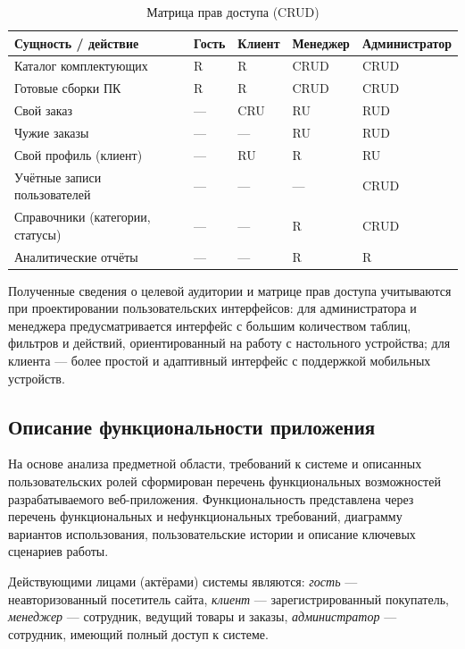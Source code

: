 \begin{table}[ht!]
\caption{Матрица прав доступа (CRUD)}
\label{tab:rbac}
\small
\begin{tabularx}{\textwidth}{|>{\RaggedRight\arraybackslash}p{}|>{\centering\arraybackslash}X|>{\centering\arraybackslash}X|>{\centering\arraybackslash}X|>{\centering\arraybackslash}X|}
\hline
\textbf{Сущность / действие} & \textbf{Гость} & \textbf{Клиент} & \textbf{Мене\-джер} & \textbf{Адми\-нистра\-тор} \\ \hline
Каталог комплектующих & R & R & CRUD & CRUD \\ \hline
Готовые сборки ПК & R & R & CRUD & CRUD \\ \hline
Свой заказ & --- & CRU & RU & RUD \\ \hline
Чужие заказы & --- & --- & RU & RUD \\ \hline
Свой профиль (клиент) & --- & RU & R & RU \\ \hline
Учётные записи пользователей & --- & --- & --- & CRUD \\ \hline
Справочники (категории, статусы) & --- & --- & R & CRUD \\ \hline
Аналитические отчёты & --- & --- & R & R \\ \hline
\end{tabularx}
\end{table}

Полученные сведения о целевой аудитории и матрице прав доступа учитываются при проектировании пользовательских интерфейсов: для администратора и менеджера предусматривается интерфейс с большим количеством таблиц, фильтров и действий, ориентированный на работу с настольного устройства; для клиента --- более простой и адаптивный интерфейс с поддержкой мобильных устройств.

\subsection{Описание функциональности приложения}

На основе анализа предметной области, требований к системе и описанных пользовательских ролей сформирован перечень функциональных возможностей разрабатываемого веб-приложения. Функциональность представлена через перечень функциональных и нефункциональных требований, диаграмму вариантов использования, пользовательские истории и описание ключевых сценариев работы.

Действующими лицами (актёрами) системы являются: \emph{гость} --- неавторизованный посетитель сайта, \emph{клиент} --- зарегистрированный покупатель, \emph{менеджер} --- сотрудник, ведущий товары и заказы, \emph{администратор} --- сотрудник, имеющий полный доступ к системе.

